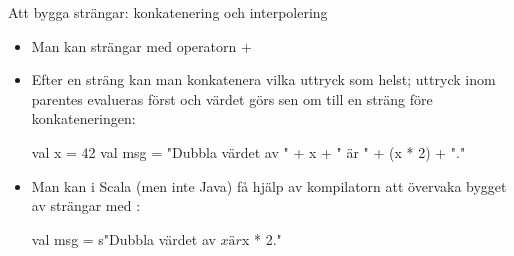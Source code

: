 


\begin{Slide}{Att bygga strängar: konkatenering och interpolering}
\begin{itemize}
\item Man kan  strängar med operatorn + \\ 
\item Efter en sträng kan man konkatenera vilka uttryck som helst; uttryck inom parentes evalueras först och värdet görs sen om till en sträng före konkateneringen:
\begin{Code}
val x = 42
val msg = "Dubbla värdet av " + x + " är " + (x * 2) + "."
\end{Code}
\item Man kan i Scala (men inte Java) få hjälp av kompilatorn att övervaka bygget av strängar med  :
\begin{Code}
val msg = s"Dubbla värdet av $x är ${x * 2}."
\end{Code}

\end{itemize}
\end{Slide}

